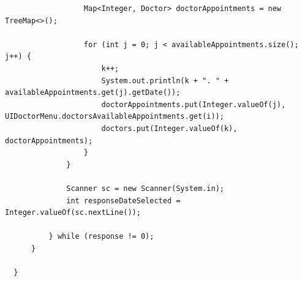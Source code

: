 \documentclass{article}
\begin{document}
\begin{verbatim}
                  Map<Integer, Doctor> doctorAppointments = new TreeMap<>();

                  for (int j = 0; j < availableAppointments.size(); j++) {
                      k++;
                      System.out.println(k + ". " + availableAppointments.get(j).getDate());
                      doctorAppointments.put(Integer.valueOf(j), UIDoctorMenu.doctorsAvailableAppointments.get(i));
                      doctors.put(Integer.valueOf(k), doctorAppointments);
                  }
              }

              Scanner sc = new Scanner(System.in);
              int responseDateSelected = Integer.valueOf(sc.nextLine());

          } while (response != 0);
      }

  }
\end{verbatim}
\end{document}
